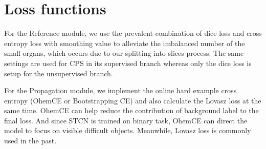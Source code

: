 \section{Loss functions}
\label{sec:loss}

For the Reference module, we use the prevalent combination of dice loss and cross entropy loss with smoothing value to alleviate the imbalanced number of the small organs, which occurs due to our splitting into slices process. The same settings are used for CPS in its supervised branch whereas only the dice loss is setup for the unsupervised branch. 

For the Propagation module, we implement the online hard example cross entropy (OhemCE or Bootstrapping CE) \cite{ohemce16wu} and also calculate the Lovasz loss \cite{lovasz18berman} at the same time. OhemCE can help reduce the contribution of background label to the final loss. And since STCN is trained on binary task, OhemCE can direct the model to focus on visible difficult objects. Meanwhile, Lovasz loss is commonly used in the past. 